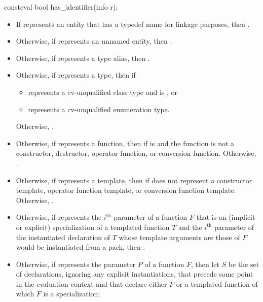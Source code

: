 %
\begin{itemdecl}
consteval bool has_identifier(info r);
\end{itemdecl}

\begin{itemdescr}
\pnum
\returns
\begin{itemize}
\item
  If  represents an entity
  that has a typedef name for linkage purposes,
  then .
\item
  Otherwise, if  represents an unnamed entity,
  then .
\item
  Otherwise, if  represents a type alias,
  then .
\item
  Otherwise, if  represents a type,
  then  if
  \begin{itemize}
  \item
     represents a cv-unqualified class type and
     is , or
  \item
     represents a cv-unqualified enumeration type.
  \end{itemize}
  Otherwise, .
\item
  Otherwise, if  represents a function,
  then  if  is 
  and the function is not a
  constructor,
  destructor,
  operator function, or
  conversion function.
  Otherwise, .
\item
  Otherwise, if  represents a template,
  then  if  does not represent a
  constructor template,
  operator function template,
  or conversion function template.
  Otherwise, .
\item
  Otherwise, if  represents the $i^\text{th}$ parameter of a function $F$
  that is an (implicit or explicit) specialization of a templated function $T$
  and the $i^\text{th}$ parameter of the instantiated declaration of $T$
  whose template arguments are those of $F$ would be instantiated from a pack,
  then .
\item
  Otherwise, if  represents the parameter $P$ of  a function $F$,
  then let $S$ be the set of declarations,
  ignoring any explicit instantiations,
  that precede some point in the evaluation context
  and that declare either $F$ or a templated function
  of which $F$ is a specialization;

\end{itemize}
\end{itemdescr}
